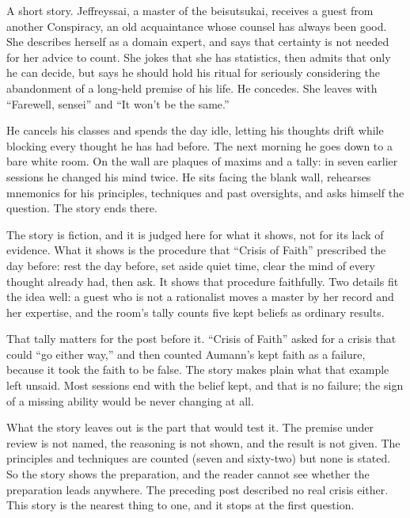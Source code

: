 \begin{afterword}
\summaryhead

A short story. Jeffreyssai, a master of the beisutsukai, receives a guest from another Conspiracy, an old acquaintance whose counsel has always been good. She describes herself as a domain expert, and says that certainty is not needed for her advice to count. She jokes that she has statistics, then admits that only he can decide, but says he should hold his ritual for seriously considering the abandonment of a long-held premise of his life. He concedes. She leaves with ``Farewell, sensei'' and ``It won't be the same.''

He cancels his classes and spends the day idle, letting his thoughts drift while blocking every thought he has had before. The next morning he goes down to a bare white room. On the wall are plaques of maxims and a tally: in seven earlier sessions he changed his mind twice. He sits facing the blank wall, rehearses mnemonics for his principles, techniques and past oversights, and asks himself the question. The story ends there.

\responsehead

The story is fiction, and it is judged here for what it shows, not for its lack of evidence. What it shows is the procedure that ``Crisis of Faith'' prescribed the day before: rest the day before, set aside quiet time, clear the mind of every thought already had, then ask. It shows that procedure faithfully. Two details fit the idea well: a guest who is not a rationalist moves a master by her record and her expertise, and the room's tally counts five kept beliefs as ordinary results.

That tally matters for the post before it. ``Crisis of Faith'' asked for a crisis that could ``go either way,'' and then counted Aumann's kept faith as a failure, because it took the faith to be false. The story makes plain what that example left unsaid. Most sessions end with the belief kept, and that is no failure; the sign of a missing ability would be never changing at all.

What the story leaves out is the part that would test it. The premise under review is not named, the reasoning is not shown, and the result is not given. The principles and techniques are counted (seven and sixty-two) but none is stated. So the story shows the preparation, and the reader cannot see whether the preparation leads anywhere. The preceding post described no real crisis either. This story is the nearest thing to one, and it stops at the first question.


\end{afterword}
